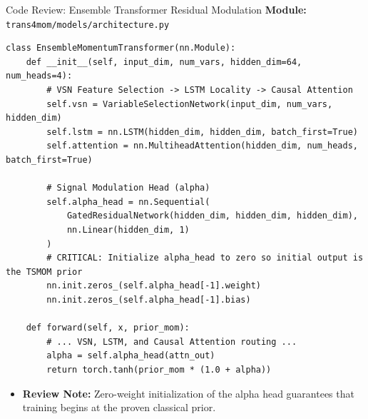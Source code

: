 \documentclass[10pt]{beamer}
\begin{document}
\begin{frame}[fragile]{Code Review: Ensemble Transformer Residual Modulation}
  \textbf{\scriptsize Module:} \texttt{trans4mom/models/architecture.py}
\begin{lstlisting}
class EnsembleMomentumTransformer(nn.Module):
    def __init__(self, input_dim, num_vars, hidden_dim=64, num_heads=4):
        # VSN Feature Selection -> LSTM Locality -> Causal Attention
        self.vsn = VariableSelectionNetwork(input_dim, num_vars, hidden_dim)
        self.lstm = nn.LSTM(hidden_dim, hidden_dim, batch_first=True)
        self.attention = nn.MultiheadAttention(hidden_dim, num_heads, batch_first=True)
        
        # Signal Modulation Head (alpha)
        self.alpha_head = nn.Sequential(
            GatedResidualNetwork(hidden_dim, hidden_dim, hidden_dim),
            nn.Linear(hidden_dim, 1)
        )
        # CRITICAL: Initialize alpha_head to zero so initial output is the TSMOM prior
        nn.init.zeros_(self.alpha_head[-1].weight)
        nn.init.zeros_(self.alpha_head[-1].bias)

    def forward(self, x, prior_mom):
        # ... VSN, LSTM, and Causal Attention routing ...
        alpha = self.alpha_head(attn_out)
        return torch.tanh(prior_mom * (1.0 + alpha))
\end{lstlisting}
  \begin{itemize}\tiny
    \item \textbf{Review Note:} Zero-weight initialization of the alpha head guarantees that training begins at the proven classical prior.
  \end{itemize}
\end{frame}
\end{document}
